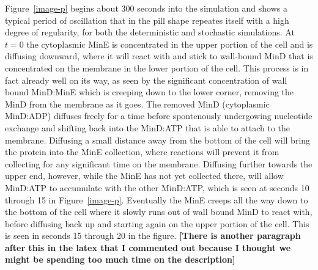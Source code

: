 \documentclass[letterpaper,twocolumn,amsmath,amssymb,pre]{revtex4-1}
\newcommand{\red}[1]{{\bf \color{red} #1}}
\newcommand{\fixme}[1]{\red{[#1]}}
\begin{document}
Figure~\ref{image-p} begins about 300 seconds into the simulation and
shows a typical period of oscillation that in the pill shape repeates
itself with a high degree of regularity, for both the deterministic
and stochastic simulations.  At $t=0$ the cytoplasmic MinE is
concentrated in the upper portion of the cell and is diffusing
downward, where it will react with and stick to wall-bound MinD that
is concentrated on the membrane in the lower portion of the cell.
This process is in fact already well on its way, as seen by the
significant concentration of wall bound MinD:MinE which is creeping
down to the lower corner, removing the MinD from the membrane as it
goes.  The removed MinD (cytoplasmic MinD:ADP) diffuses freely for a
time before spontenously undergowing nucleotide exchange and shifting
back into the MinD:ATP that is able to attach to the membrane.
Diffusing a small distance away from the bottom of the cell will bring
the protein into the MinE collection, where reactions will prevent it
from collecting for any significant time on the membrane.  Diffusing
further towards the upper end, however, while the MinE has not yet
collected there, will allow MinD:ATP to accumulate with the other
MinD:ATP, which is seen at seconds 10 through 15 in
Figure~\ref{image-p}.  Eventually the MinE creeps all the way down to
the bottom of the cell where it slowly runs out of wall bound MinD to
react with, before diffusing back up and starting again on the upper
portion of the cell. This is seen in seconds 15 through 20 in the
figure.  \fixme{There is another paragraph after this in the latex
  that I commented out because I thought we might be spending too much
  time on the description}

\end{document}
